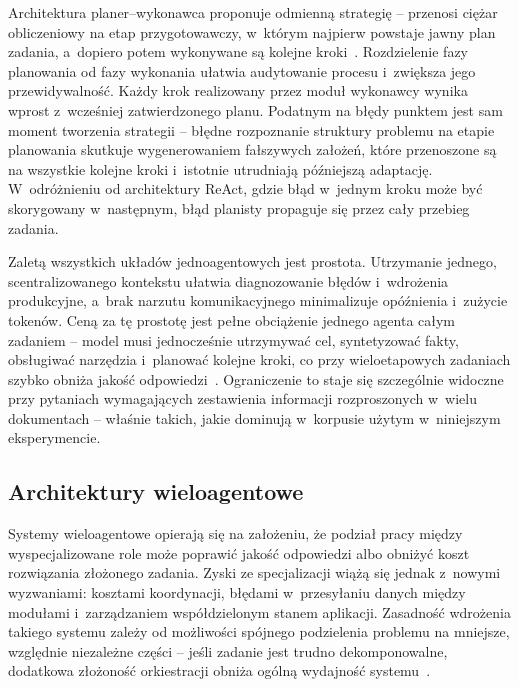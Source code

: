 Architektura planer--wykonawca proponuje odmienną strategię -- przenosi ciężar
obliczeniowy na etap przygotowawczy, w~którym najpierw powstaje jawny plan
zadania, a~dopiero potem wykonywane są kolejne kroki~\cite{wang2023plan}.
Rozdzielenie fazy planowania od fazy wykonania ułatwia audytowanie procesu
i~zwiększa jego przewidywalność. Każdy krok realizowany przez moduł wykonawcy
wynika wprost z~wcześniej zatwierdzonego planu. Podatnym na błędy punktem jest
sam moment tworzenia strategii -- błędne rozpoznanie struktury problemu na
etapie planowania skutkuje wygenerowaniem fałszywych założeń, które przenoszone
są na wszystkie kolejne kroki i~istotnie utrudniają późniejszą adaptację.
W~odróżnieniu od architektury ReAct, gdzie błąd w~jednym kroku może być
skorygowany w~następnym, błąd planisty propaguje się przez cały przebieg
zadania.

Zaletą wszystkich układów jednoagentowych jest prostota. Utrzymanie jednego,
scentralizowanego kontekstu ułatwia diagnozowanie błędów i~wdrożenia
produkcyjne, a~brak narzutu komunikacyjnego minimalizuje opóźnienia i~zużycie
tokenów. Ceną za tę prostotę jest pełne obciążenie jednego agenta całym
zadaniem -- model musi jednocześnie utrzymywać cel, syntetyzować fakty,
obsługiwać narzędzia i~planować kolejne kroki, co przy wieloetapowych zadaniach
szybko obniża jakość odpowiedzi~\cite{wang2024survey, xi2025rise}. Ograniczenie
to staje się szczególnie widoczne przy pytaniach wymagających zestawienia
informacji rozproszonych w~wielu dokumentach -- właśnie takich, jakie dominują
w~korpusie użytym w~niniejszym eksperymencie.

\subsection{Architektury wieloagentowe}\label{subsec:architektury-wieloagentowe}

Systemy wieloagentowe opierają się na założeniu, że podział pracy między
wyspecjalizowane role może poprawić jakość odpowiedzi albo obniżyć koszt
rozwiązania złożonego zadania. Zyski ze specjalizacji wiążą się jednak z~nowymi
wyzwaniami: kosztami koordynacji, błędami w~przesyłaniu danych między modułami
i~zarządzaniem współdzielonym stanem aplikacji. Zasadność wdrożenia takiego
systemu zależy od możliwości spójnego podzielenia problemu na mniejsze,
względnie niezależne części -- jeśli zadanie jest trudno dekomponowalne,
dodatkowa złożoność orkiestracji obniża ogólną wydajność
systemu~\cite{wang2024survey, wu2024autogen, guo2024large}.

